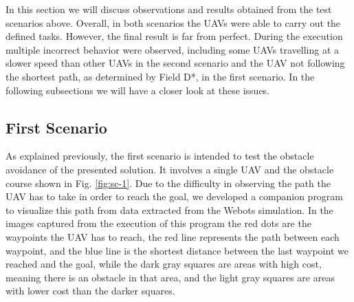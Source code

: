 In this section we will discuss observations and results obtained from the test scenarios above. 
Overall, in both scenarios the UAVs were able to carry out the defined tasks. However, the 
final result is far from perfect. During the execution multiple incorrect behavior were
observed, including some UAVs travelling at a slower speed than other UAVs in the second 
scenario and the UAV not following the shortest path, as determined by Field D*, in the 
first scenario. In the following subsections we will have a closer look at these issues.

\subsection{First Scenario}

As explained previously, the first scenario is intended to test the obstacle avoidance of the 
presented solution. It involves a single UAV and the obstacle course shown in Fig. \ref{fig:sc-1}. 
Due to the difficulty in observing the path the UAV has to take in order to reach the goal,
we developed a companion program to visualize this path from data extracted from the Webots 
simulation. In the images captured from the execution of this program the red dots are the 
waypoints the UAV has to reach, the red line represents the path between each waypoint, and
the blue line is the shortest distance between the last waypoint we reached and the goal, while 
the dark gray squares are areas with high cost, meaning there is an obstacle in that area, and 
the light gray squares are areas with lower cost than the darker squares.

